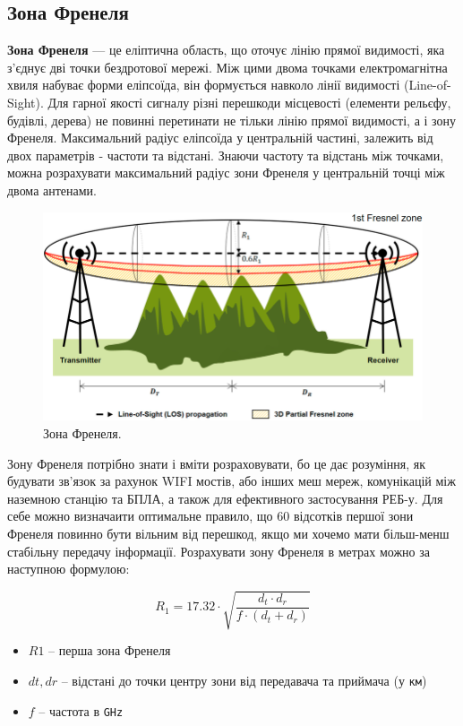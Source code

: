 \documentclass{article}
\begin{document}
\subsection{Зона Френеля}

\textbf{Зона Френеля} --- це еліптична область, що оточує лінію прямої видимості, яка з'єднує дві точки бездротової мережі. Між цими двома точками електромагнітна хвиля набуває форми еліпсоїда, він формується навколо лінії видимості (Line-of-Sight). Для гарної якості сигналу різні перешкоди місцевості (елементи рельєфу, будівлі, дерева) не повинні перетинати не тільки лінію прямої видимості, а і зону Френеля.  Максимальний радіус еліпсоїда у центральній частині, залежить від двох параметрів - частоти та відстані. Знаючи частоту та відстань між точками, можна розрахувати максимальний радіус зони Френеля у центральній точці між двома антенами.

\begin{figure}[h!]
	\centering
	\includegraphics[width=0.9\linewidth]{images/fresnel-zone.png}
	\caption{\label{fig:fresnel-zone} Зона Френеля.}
\end{figure}

Зону Френеля потрібно знати і вміти розраховувати, бо це дає розуміння, як будувати зв'язок за рахунок WIFI мостів, або інших меш мереж, комунікацій між наземною станцію та БПЛА, а також для ефективного застосування РЕБ-у. Для себе можно визначаити оптимальне правило, що 60 відсотків першої зони Френеля повинно бути вільним від перешкод, якщо ми хочемо мати більш-менш стабільну передачу інформації. Розрахувати зону Френеля в метрах можно за наступною формулою:


\[
R_1 = 17.32 \cdot \sqrt{\frac{d_t \cdot d_r}{f \cdot (d_t + d_r)}}
\]

\begin{itemize}[noitemsep, topsep=8pt]
	\item $R1$ -- перша зона Френеля
	\item $dt,dr$ -- відстані до точки центру зони від передавача та приймача (у \texttt{км})
	\item ${f}$ -- частота в \texttt{GHz}
\end{itemize}
\end{document}
